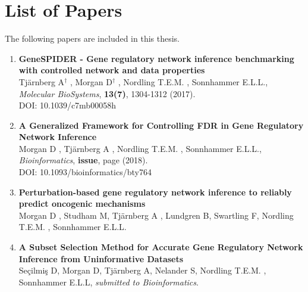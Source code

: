 \chapter{List of Papers}

\vspace{-5pt} %

The following papers are included in this thesis.

\vspace{0pt} %


\begin{enumerate}[P{A}PER I: ]

\setlength{\itemsep}{3.3mm} %



\item\textbf{GeneSPIDER - Gene regulatory network inference benchmarking with controlled network and data properties}\\
Tj{\"a}rnberg A\textit{$^{\dagger}$} , Morgan D\textit{$^{\dagger}$} ,  Nordling T.E.M. , Sonnhammer E.L.L., \emph{Molecular BioSystems}, \textbf{13(7)}, 1304-1312 (2017).\\
DOI: 10.1039/c7mb00058h{} 

\item\textbf{A Generalized Framework for Controlling FDR in Gene Regulatory Network Inference}\\
Morgan D , Tj{\"a}rnberg A , Nordling T.E.M. , Sonnhammer E.L.L., \emph{Bioinformatics}, \textbf{issue}, page (2018).\\
DOI: 10.1093/bioinformatics/bty764{} 

\item\textbf{Perturbation-based gene regulatory network inference to reliably predict oncogenic mechanisms}\\
Morgan D , Studham M, Tj{\"a}rnberg A , Lundgren B, Swartling F, Nordling T.E.M. , Sonnhammer E.L.L.

\item\textbf{A Subset Selection Method for Accurate Gene Regulatory Network Inference from Uninformative Datasets}\\
Seçilmiş D, Morgan D, Tj{\"a}rnberg A, Nelander S, Nordling T.E.M. , Sonnhammer E.L.L, \emph{submitted to Bioinformatics}.


\end{enumerate}
